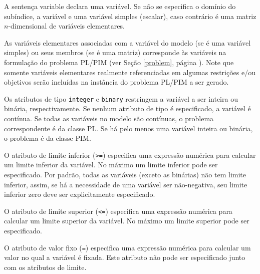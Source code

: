 \documentclass[11pt, brazil]{report}
\begin{document}
A sentença variable declara uma variável. Se não se especifica o
domínio do subíndice, a variável e uma variável simples (escalar),
caso contrário é uma matriz $n$-dimensional de variáveis elementares.

As variáveis elementares associadas com a variável do modelo
(se é uma variável simples) ou seus membros (se é uma matriz) corresponde
às variáveis na formulação do problema PL/PIM (ver Seção \ref{problem},
página \pageref{problem}). Note que somente variáveis elementares
realmente referenciadas em algumas restrições e/ou objetivos serão
incluídas na instância do problema PL/PIM a ser gerado.

Os atributos de tipo {\tt integer} e {\tt binary} restringem a variável
a ser inteira ou binária, \linebreak respectivamente. Se nenhum atributo de tipo
é especificado, a variável é contínua. Se todas as variáveis no modelo
são contínuas, o problema correspondente é da classe PL. Se há pelo
menos uma variável inteira ou binária, o problema é da classe PIM.

\newpage

O atributo de limite inferior ({\tt>=}) especifica uma expressão numérica
para calcular um limite inferior da variável. No máximo um limite inferior
pode ser especificado. Por padrão, todas as variáveis (exceto as binárias)
não tem limite inferior, assim, se há a necessidade de uma variável ser
não-negativa, seu limite inferior zero deve ser explicitamente especificado.

O atributo de limite superior ({\tt<=}) especifica uma expressão numérica
para calcular um limite superior da variável. No máximo um limite superior
pode ser especificado.

O atributo de valor fixo ({\tt=}) especifica uma expressão numérica para
calcular um valor no qual a variável é fixada. Este atributo não pode
ser especificado junto com os atributos de limite.
\end{document}
